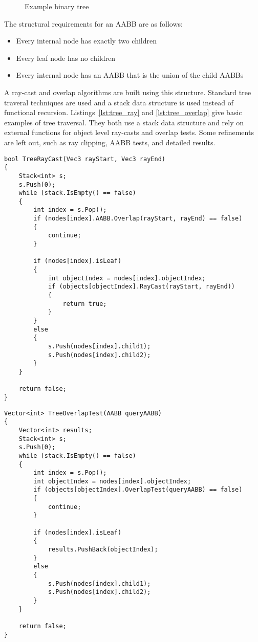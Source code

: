 \documentclass{article}
\begin{document}
\begin{figure}
	\begin{center}
		
	\end{center}
	\caption{Example binary tree}
	\label{fig:example_tree}
\end{figure}

The structural requirements for an AABB are as follows:
\begin{itemize}
	\item Every internal node has exactly two children
	\item Every leaf node has no children
	\item Every internal node has an AABB that is the union of the child AABBs
\end{itemize}

A ray-cast and overlap algorithms are built using this structure. Standard tree traveral techniques are used and a stack data structure is used instead of functional recursion. Listings~\ref{lst:tree_ray} and \ref{lst:tree_overlap} give basic examples of tree traversal. They both use a stack data structure and rely on external functions for object level ray-casts and overlap tests. Some refinements are left out, such as ray clipping, AABB tests, and detailed results.

\begin{lstlisting}[caption={Tree ray-cast}, label={lst:tree_ray}, float]
bool TreeRayCast(Vec3 rayStart, Vec3 rayEnd)
{
	Stack<int> s;
	s.Push(0);
	while (stack.IsEmpty() == false)
	{
		int index = s.Pop();
		if (nodes[index].AABB.Overlap(rayStart, rayEnd) == false)
		{
			continue;
		}

		if (nodes[index].isLeaf)
		{
			int objectIndex = nodes[index].objectIndex;
			if (objects[objectIndex].RayCast(rayStart, rayEnd))
			{
				return true;
			}
		}
		else
		{
			s.Push(nodes[index].child1);
			s.Push(nodes[index].child2);
		}
	}

	return false;
}
\end{lstlisting}

\begin{lstlisting}[caption={Tree overlap test}, label={lst:tree_overlap}, float]
Vector<int> TreeOverlapTest(AABB queryAABB)
{
	Vector<int> results;
	Stack<int> s;
	s.Push(0);
	while (stack.IsEmpty() == false)
	{
		int index = s.Pop();
		int objectIndex = nodes[index].objectIndex;
		if (objects[objectIndex].OverlapTest(queryAABB) == false)
		{
			continue;
		}

		if (nodes[index].isLeaf)
		{
			results.PushBack(objectIndex);
		}
		else
		{
			s.Push(nodes[index].child1);
			s.Push(nodes[index].child2);
		}
	}

	return false;
}
\end{lstlisting}
\end{document}
